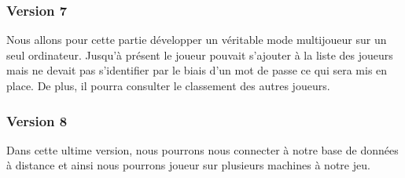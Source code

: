 \subsubsection{Version 7}
Nous allons pour cette partie développer un véritable mode multijoueur sur un seul ordinateur. Jusqu'à présent le joueur pouvait s'ajouter à la liste des joueurs mais ne devait pas s'identifier par le biais d'un mot de passe ce qui sera mis en place. De plus, il pourra consulter le classement des autres joueurs. 

\subsubsection{Version 8}
Dans cette ultime version, nous pourrons nous connecter à notre base de données à distance et ainsi nous pourrons joueur sur plusieurs machines à notre jeu. 